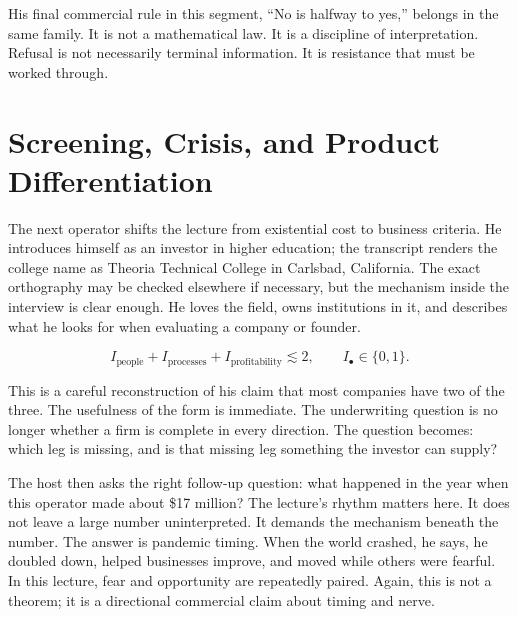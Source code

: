 His final commercial rule in this segment, ``No is halfway to yes,'' belongs in the same family. It is not a mathematical law. It is a discipline of interpretation. Refusal is not necessarily terminal information. It is resistance that must be worked through.

\section{Screening, Crisis, and Product Differentiation}

The next operator shifts the lecture from existential cost to business criteria. He introduces himself as an investor in higher education; the transcript renders the college name as Theoria Technical College in Carlsbad, California. The exact orthography may be checked elsewhere if necessary, but the mechanism inside the interview is clear enough. He loves the field, owns institutions in it, and describes what he looks for when evaluating a company or founder.

\begin{equation}
I_{\mathrm{people}} + I_{\mathrm{processes}} + I_{\mathrm{profitability}} \lesssim 2,
\qquad
I_{\bullet} \in \{0,1\}.
\end{equation}

This is a careful reconstruction of his claim that most companies have two of the three. The usefulness of the form is immediate. The underwriting question is no longer whether a firm is complete in every direction. The question becomes: which leg is missing, and is that missing leg something the investor can supply?

\begin{figure}
\centering
{}
\end{figure}

The host then asks the right follow-up question: what happened in the year when this operator made about \$17 million? The lecture's rhythm matters here. It does not leave a large number uninterpreted. It demands the mechanism beneath the number. The answer is pandemic timing. When the world crashed, he says, he doubled down, helped businesses improve, and moved while others were fearful. In this lecture, fear and opportunity are repeatedly paired. Again, this is not a theorem; it is a directional commercial claim about timing and nerve.

